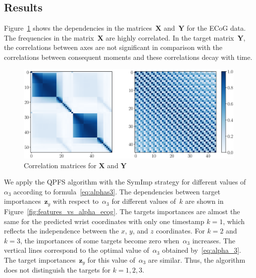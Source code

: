 \documentclass[preprint,authoryear,12pt]{elsarticle}
\theoremstyle{definition}
\newcommand{\bz}{\mathbf{z}}
\newcommand{\bY}{\mathbf{Y}}
\newcommand{\bX}{\mathbf{X}}
\begin{document}
\subsection{Results}

Figure~\ref{fig:corr_matrix} shows the dependencies in the matrices~$\bX$ and~$\bY$ for the ECoG data. The frequencies in the matrix~$\bX$ are highly correlated. 
In the target matrix~$\bY$, the correlations between axes are not significant in comparison with the correlations between consequent moments and these correlations decay with time.
\begin{figure}[h]
	\includegraphics[width=\linewidth]{corr_matrix.eps}
	\caption{Correlation matrices for $\bX$ and $\bY$}
	\label{fig:corr_matrix}
\end{figure}

We apply the QPFS algorithm with the SymImp strategy for different values of~$\alpha_3$ according to formula~\eqref{eq:alphas3}.
The dependencies between target importances~$\bz_y$ with respect to~$\alpha_3$ for different values of~$k$ are shown in Figure~\ref{fig:features_vs_alpha_ecog}.
The targets importances are almost the same for the predicted wrist coordinates with only one timestamp $k = 1$, 
which reflects the independence between the $x$, $y$, and $z$ coordinates.
For $k = 2$ and $k = 3$, the importances of some targets become zero when~$\alpha_3$ increases.
The vertical lines correspond to the optimal value of~$\alpha_3$ obtained by~\eqref{eq:alpha_3}. 
The target importances~$\bz_y$ for this value of~$\alpha_3$ are similar. 
Thus, the algorithm does not distinguish the targets for $k=1, 2, 3$.
\end{document}
